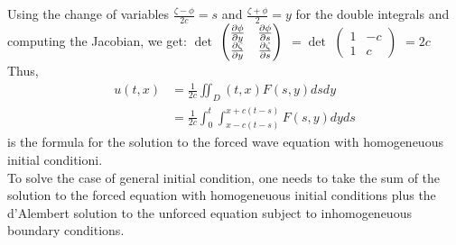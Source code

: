Using the change of variables $ \frac{\zeta-\phi}{2c}=s $ and $ \frac{\zeta+\phi}{2}=y $ for the double integrals and computing the Jacobian, we get:
$\det$
$\begin{pmatrix}
\pdv{\phi}{y} & \pdv{\phi}{s} \\
\pdv{\zeta}{y} & \pdv{\zeta}{s}
\end{pmatrix}$ $=\det$
$\begin{pmatrix}
1 & -c \\
1 & c
\end{pmatrix}$ $=2c$
\\Thus,
\begin{align*}{}{}
u(t,x)&=\frac{1}{2c}\iint_D(t,x)F(s,y)dsdy\\
&=\frac{1}{2c}\int_{0}^{t}\int_{x-c(t-s)}^{x+c(t-s)}F(s,y)dyds
\end{align*}
is the formula for the solution to the forced wave equation with homogeneuous initial conditioni.\\
To solve the case of general initial condition, one needs to take the sum of the solution to the forced equation with homogeneuous initial conditions plus the d'Alembert solution to the unforced equation subject to inhomogeneuous boundary conditions.\\
